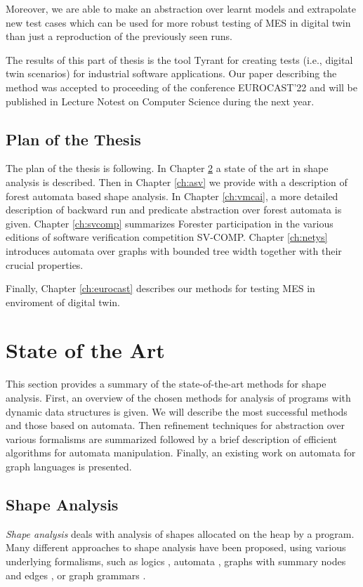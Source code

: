 Moreover, we are able to make an abstraction over learnt models and extrapolate new test
cases which can be used for more robust testing of MES in digital twin than just a reproduction
of the previously seen runs.

The results of this part of thesis is the tool Tyrant \cite{ref_tyrant} for creating tests (i.e., digital twin scenarios) for
industrial software applications.
Our paper describing the method was accepted to proceeding of the conference EUROCAST'22 and will be published
in Lecture Notest on Computer Science during the next year.

\section{Plan of the Thesis}

The plan of the thesis is following.
In Chapter \ref{ch:state-of-the-art} a state of the art in shape analysis is described.
Then in Chapter \ref{ch:asv} we provide with a description of forest automata based
shape analysis.
In Chapter \ref{ch:vmcai}, a more detailed description of backward run and predicate abstraction
over forest automata is given.
Chapter \ref{ch:svcomp} summarizes Forester participation in the various editions
of software verification competition SV-COMP.
Chapter \ref{ch:netys} introduces automata over graphs with bounded tree width together
with their crucial properties.

Finally, Chapter \ref{ch:eurocast} describes our methods for testing MES in enviroment
of digital twin.


\chapter{State of the Art}
\label{ch:state-of-the-art}
This section provides a summary of the state-of-the-art methods for shape analysis.
First, an overview of the chosen methods for analysis of programs with
dynamic data structures is given.
We will describe the most successful methods and those based on automata.
Then refinement techniques for abstraction over various formalisms are summarized
followed by a brief description of efficient algorithms for automata manipulation.
Finally, an existing work on automata for graph languages is presented.

\section{Shape Analysis}
\emph{Shape analysis} deals with analysis of shapes allocated on the heap by a program.
Many different approaches to shape analysis have been proposed, using various
underlying formalisms, such as logics
\cite{jensen,pale,InvaderCAV08,thor10,dragoi:atva12,sleek13}, automata
\cite{bhrv06b,deg06,forester12,boxes13,lists-counters}, graphs with summary nodes and edges
\cite{sas07:chang_rival_necula,dudka13sas}, or graph grammars \cite{juggrnaut10}.

